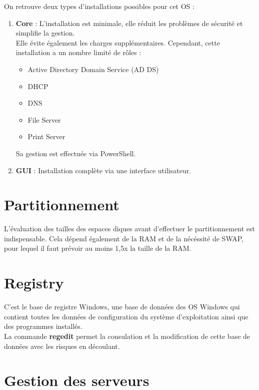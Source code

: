 \documentclass{report}
\begin{document}
		On retrouve deux types d'installations possibles pour cet OS : \\

		\begin{enumerate}
			\item \textbf{Core} : L'installation est minimale, elle réduit les problèmes de sécurité et simplifie la gestion.\\
			Elle évite également les charges supplémentaires. Cependant, cette installation a un nombre limité de rôles : \\
			\begin{itemize}
				\item Active Directory Domain Service (AD DS)
				\item DHCP
				\item DNS
				\item File Server
				\item Print Server
			\end{itemize}
			Sa gestion est effectuée via PowerShell.\\
			\item \textbf{GUI} : Installation complète via une interface utilisateur.\\
		\end{enumerate}

	\section{Partitionnement}

		L'évaluation des tailles des espaces diques avant d'effectuer le partitionnement est indispensable. Cela dépend également de la RAM et de la nécéssité de SWAP, pour lequel il faut prévoir au moins 1,5x la taille de la RAM.\\

	\section{Registry}

		C'est le base de registre Windows, une base de données des OS Windows qui contient toutes les données de configuration du système d'exploitation ainsi que des programmes installés.\\

		La commande \textbf{regedit} permet la consulation et la modification de cette base de données avec les risques en découlant.\\

	\section{Gestion des serveurs}
\end{document}
